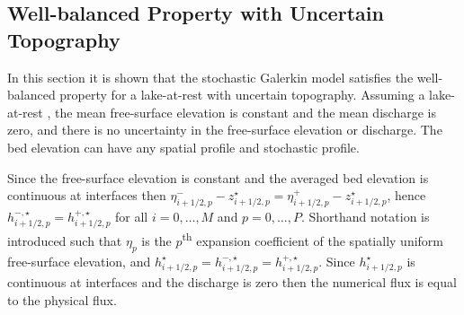 \subsection{Well-balanced Property with Uncertain Topography}

In this section it is shown that the stochastic Galerkin model satisfies the well-balanced property for a lake-at-rest with uncertain topography.
Assuming a lake-at-rest , the mean free-surface elevation is constant and the mean discharge is zero, and there is no uncertainty in the free-surface elevation or discharge.
The bed elevation can have any spatial profile and stochastic profile.

Since the free-surface elevation is constant and the averaged bed elevation is continuous at interfaces then $\eta_{i+1/2,p}^- - z^\star_{i+1/2,p} = \eta_{i+1/2,p}^+ - z^\star_{i+1/2,p}$, hence $h^{-,\star}_{i+1/2,p} = h^{+,\star}_{i+1/2,p}$ for all $i = 0, \ldots, M$ and $p = 0, \ldots, P$.
Shorthand notation is introduced such that
$\eta_p$ is the $p$\textsuperscript{th} expansion coefficient of the spatially uniform free-surface elevation, and
$h^\star_{i+1/2,p} = h^{-,\star}_{i+1/2,p} = h^{+,\star}_{i+1/2,p}$.
Since $h^\star_{i+1/2,p}$ is continuous at interfaces and the discharge is zero then the numerical flux is equal to the physical flux.


